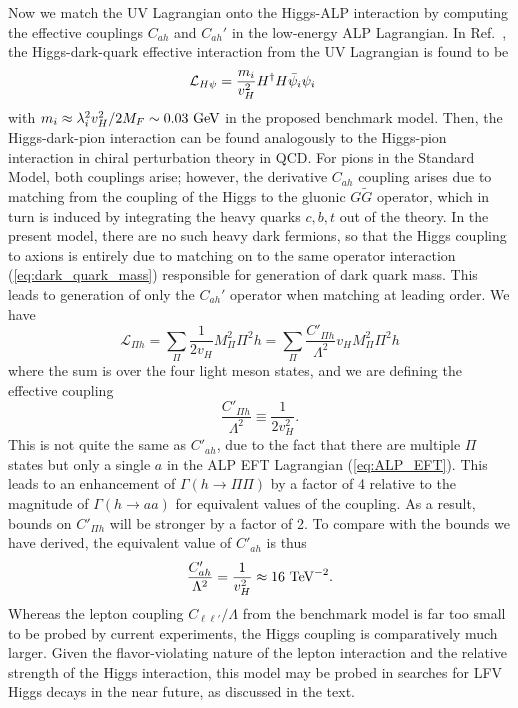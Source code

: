 Now we match the UV Lagrangian onto the Higgs-ALP interaction by computing the effective couplings $C_{ah}$ and $C_{ah}'$ in the low-energy ALP Lagrangian. In Ref.~\cite{Davoudiasl:2017zws}, the Higgs-dark-quark effective interaction from the UV Lagrangian is found to be
\begin{align}
    {\cal L}_{H\psi} &= \frac{m_i}{v_H^2} H^\dagger H \bar{\psi}_i\psi_i\label{eq:dark_quark_mass}
\end{align}
with $m_i \approx \lambda_i^2 v_H^2 / 2M_F \sim 0.03~{\rm GeV}$ in the proposed benchmark model. Then, the Higgs-dark-pion interaction can be found analogously to the Higgs-pion interaction in chiral perturbation theory in QCD. For pions in the Standard Model, both couplings arise; however, the derivative $C_{ah}$ coupling arises due to matching from the coupling of the Higgs to the gluonic $G \tilde{G}$ operator, which in turn is induced by integrating the heavy quarks $c,b,t$ out of the theory.  In the present model, there are no such heavy dark fermions, so that the Higgs coupling to axions is entirely due to matching on to the same operator interaction (\ref{eq:dark_quark_mass}) responsible for generation of dark quark mass.  This leads to generation of only the $C_{ah}'$ operator when matching at leading order.  We have
%
\begin{equation}
\mathcal{L}_{\Pi h} = \sum_{\Pi} \frac{1}{2v_H} M_\Pi^2 \Pi^2 h =  \sum_{\Pi} \frac{C'_{\Pi h}}{\Lambda^2} v_H M_\Pi^2 \Pi^2 h
\end{equation}
%
where the sum is over the four light meson states, and we are defining the effective coupling
%
\begin{equation}
\frac{C'_{\Pi h}}{\Lambda^2} \equiv \frac{1}{2v_H^2}.
\end{equation}
%
This is not quite the same as $C'_{ah}$, due to the fact that there are multiple $\Pi$ states but only a single $a$ in the ALP EFT Lagrangian (\ref{eq:ALP_EFT}).  This leads to an enhancement of $\Gamma(h \rightarrow \Pi \Pi)$ by a factor of 4 relative to the magnitude of $\Gamma(h \rightarrow aa)$ for equivalent values of the coupling.  As a result, bounds on $C'_{\Pi h}$ will be stronger by a factor of 2.  To compare with the bounds we have derived, the equivalent value of $C'_{ah}$ is thus
%
\begin{equation} \label{eq:Cahp_UV}
\frac{C_{ah}'}{\Lambda^2} = \frac{1}{v_H^2} \approx 16\ {\rm TeV}^{-2}.
\end{equation}
%
Whereas the lepton coupling $C_{\ell\ell'}/\Lambda$ from the benchmark model is far too small to be probed by current experiments, the Higgs coupling is comparatively much larger. Given the flavor-violating nature of the lepton interaction and the relative strength of the Higgs interaction, this model may be probed in searches for LFV Higgs decays in the near future, as discussed in the text. 

